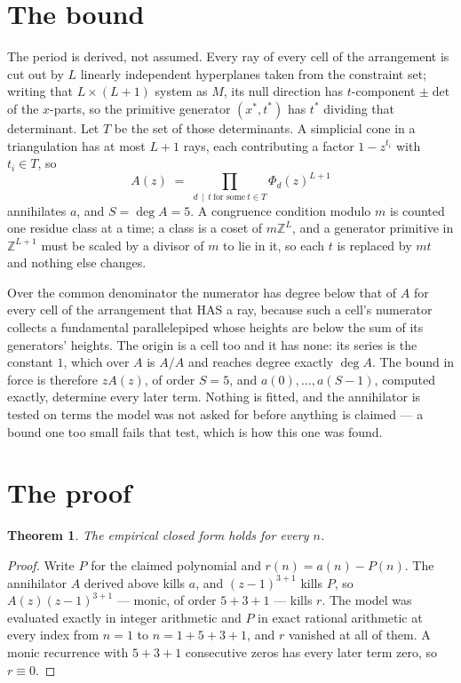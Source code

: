 \documentclass[11pt,a4paper]{article}
\theoremstyle{plain}
\newtheorem{theorem}{Theorem}
\theoremstyle{definition}
\begin{document}
\section{The bound}

The period is derived, not assumed. Every ray of every cell of the arrangement is cut out by
$L$ linearly independent hyperplanes taken from the constraint set; writing that $L\times(L+1)$
system as $M$, its null direction has $t$-component $\pm\det$ of the $x$-parts, so the
primitive generator $(x^*,t^*)$ has $t^*$ dividing that determinant. Let $T$ be the set of
those determinants. A simplicial cone in a triangulation has at most $L+1$ rays, each
contributing a factor $1-z^{t_i}$ with $t_i\in T$, so
\[
A(z)\;=\;\prod_{d\,\mid\,t\ \text{for some}\ t\in T}\Phi_d(z)^{L+1}
\]
annihilates $a$, and $S=\deg A=5$. A congruence condition modulo $m$ is counted one residue
class at a time; a class is a coset of $m\mathbb{Z}^L$, and a generator primitive in
$\mathbb{Z}^{L+1}$ must be scaled by a divisor of $m$ to lie in it, so each $t$ is replaced
by $mt$ and nothing else changes.

Over the common denominator the numerator has degree below that of $A$ for every cell of the
arrangement that HAS a ray, because such a cell's numerator collects a fundamental
parallelepiped whose heights are below the sum of its generators' heights. The origin is a cell
too and it has none: its series is the constant $1$, which over $A$ is $A/A$ and reaches degree
exactly $\deg A$. The bound in force is therefore $zA(z)$, of order $S=5$, and
$a(0),\dots,a(S-1)$, computed exactly, determine every later term. Nothing is fitted, and the
annihilator is tested on terms the model was not asked for before anything is claimed --- a
bound one too small fails that test, which is how this one was found.

\section{The proof}

\begin{theorem}
The empirical closed form holds for every $n$.
\end{theorem}

\begin{proof}
Write $P$ for the claimed polynomial and $r(n)=a(n)-P(n)$. The annihilator $A$ derived above
kills $a$, and $(z-1)^{3+1}$ kills $P$, so $A(z)(z-1)^{3+1}$ --- monic, of order
$5+3+1$ --- kills $r$. The model was evaluated exactly in integer arithmetic and $P$ in
exact rational arithmetic at every index from $n=1$ to $n=1+5+3+1$, and $r$ vanished
at all of them. A monic recurrence with $5+3+1$ consecutive zeros has every later term zero,
so $r\equiv0$.
\end{proof}
\end{document}
